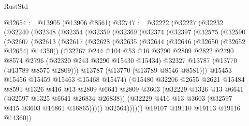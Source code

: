 \begin{lexlean}{RustStd}
\begin{coremodule}
@32654 := @13905 (@13906 @8561)
@32747 := @32222
    (@32227
      (@32232
        (@32240
          (@32348
            (@32354
              (@32359
                (@32369
                  (@32374
                    (@32397
                      (@32575
                        (@32590
                          (@32607
                            (@32613
                              (@32617
                                (@32628
                                  (@32635
                                    (@32644
                                      (@32646 (@32650 (@32652 @32654) @14350))
                                      (@32267
                                        @244
                                        @104
                                        @53
                                        @16
                                        @3290
                                        @2809
                                        @2822
                                        @2790
                                        @8574
                                        @2796
                                        (@32320 @243 @3290 @15430 @15434)
                                        @32327
                                        @13787
                                        (@13770 (@13789 @8575 @2809)))
                                      @13787
                                      (@13770 (@13789 @8546 @8581)))
                                    @15453
                                    @15456
                                    @15459
                                    @15463
                                    @15468
                                    @15474)
                                  (@15480
                                    @32206
                                    @2655
                                    @2621
                                    @15484
                                    @8591
                                    @1326
                                    @416
                                    @13
                                    @2809
                                    @6641
                                    @2809
                                    @3603
                                    (@32229 @1326 @13 @6641 (@32597 @1325 @6641 @26834 @26838))
                                    (@32229 @416 @13 @3603 (@32597 @415 @3603 @16861 @16865)))))
                              @32564))))))
                  @19107
                  @19110
                  @19113
                  @19116
                  @14360))

\end{coremodule}
\end{lexlean}
